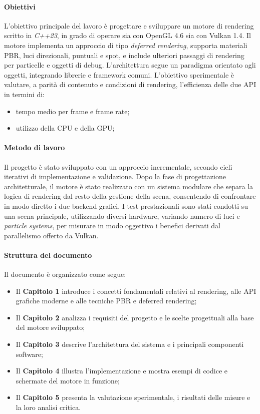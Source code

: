 \documentclass[12pt,a4paper,openright,twoside]{book}
\begin{document}
\paragraph{Obiettivi}
L’obiettivo principale del lavoro è progettare e sviluppare un motore di rendering scritto in \emph{C++23},
in grado di operare sia con OpenGL 4.6 sia con Vulkan 1.4.
Il motore implementa un approccio di tipo \emph{deferred rendering}, supporta materiali \ac{PBR}, luci direzionali,
puntuali e spot, e include ulteriori passaggi di rendering per particelle e oggetti di debug.
L’architettura segue un paradigma orientato agli oggetti, integrando librerie e framework comuni.
L’obiettivo sperimentale è valutare, a parità di contenuto e condizioni di rendering, l’efficienza delle due API 
in termini di:
\begin{itemize}
    \item tempo medio per frame e frame rate;
    \item utilizzo della \acs{CPU} e della \acs{GPU};
\end{itemize}

\paragraph{Metodo di lavoro}
Il progetto è stato sviluppato con un approccio incrementale, secondo cicli iterativi di implementazione e validazione.  
Dopo la fase di progettazione architetturale, il motore è stato realizzato con un sistema modulare che separa la logica
di rendering dal resto della gestione della scena, consentendo di confrontare in modo diretto i due backend grafici.  
I test prestazionali sono stati condotti su una scena principale, utilizzando diversi hardware, variando numero di luci
e \emph{particle systems}, per misurare in modo oggettivo i benefici derivati dal parallelismo offerto da Vulkan.

\paragraph{Struttura del documento}
Il documento è organizzato come segue:
\begin{itemize}
   \item Il \textbf{Capitolo 1} introduce i concetti fondamentali relativi al rendering, alle \ac{API} grafiche moderne e alle tecniche \ac{PBR} e deferred rendering;
   \item Il \textbf{Capitolo 2} analizza i requisiti del progetto e le scelte progettuali alla base del motore sviluppato;
   \item Il \textbf{Capitolo 3} descrive l’architettura del sistema e i principali componenti software;
   \item Il \textbf{Capitolo 4} illustra l’implementazione e mostra esempi di codice e schermate del motore in funzione;
   \item Il \textbf{Capitolo 5} presenta la valutazione sperimentale, i risultati delle misure e la loro analisi critica.
\end{itemize}
\end{document}
